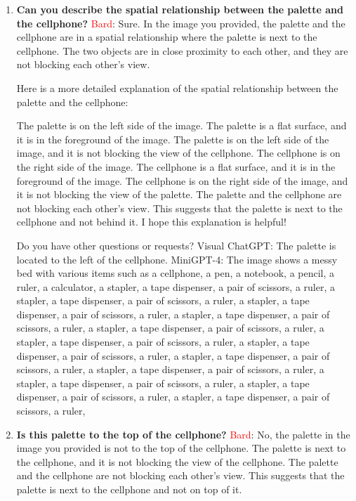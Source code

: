 \begin{enumerate}
    \item \textbf{Can you describe the spatial relationship between the palette and the cellphone?}
    \subitem \textcolor{Red}{Bard}: 
    Sure. In the image you provided, the palette and the cellphone are in a spatial relationship where the palette is next to the cellphone. The two objects are in close proximity to each other, and they are not blocking each other's view.
    
    Here is a more detailed explanation of the spatial relationship between the palette and the cellphone:
    
    The palette is on the left side of the image. The palette is a flat surface, and it is in the foreground of the image. The palette is on the left side of the image, and it is not blocking the view of the cellphone.
    The cellphone is on the right side of the image. The cellphone is a flat surface, and it is in the foreground of the image. The cellphone is on the right side of the image, and it is not blocking the view of the palette.
    The palette and the cellphone are not blocking each other's view. This suggests that the palette is next to the cellphone and not behind it.
    I hope this explanation is helpful!
    
    Do you have other questions or requests?
    \subitem Visual ChatGPT: The palette is located to the left of the cellphone.
    \subitem MiniGPT-4: The image shows a messy bed with various items such as a cellphone, a pen, a notebook, a pencil, a ruler, a calculator, a stapler, a tape dispenser, a pair of scissors, a ruler, a stapler, a tape dispenser, a pair of scissors, a ruler, a stapler, a tape dispenser, a pair of scissors, a ruler, a stapler, a tape dispenser, a pair of scissors, a ruler, a stapler, a tape dispenser, a pair of scissors, a ruler, a stapler, a tape dispenser, a pair of scissors, a ruler, a stapler, a tape dispenser, a pair of scissors, a ruler, a stapler, a tape dispenser, a pair of scissors, a ruler, a stapler, a tape dispenser, a pair of scissors, a ruler, a stapler, a tape dispenser, a pair of scissors, a ruler, a stapler, a tape dispenser, a pair of scissors, a ruler, a stapler, a tape dispenser, a pair of scissors, a ruler,
    \item \textbf{Is this palette to the top of the cellphone?}
    \subitem \textcolor{Red}{Bard}: No, the palette in the image you provided is not to the top of the cellphone. The palette is next to the cellphone, and it is not blocking the view of the cellphone. The palette and the cellphone are not blocking each other's view. This suggests that the palette is next to the cellphone and not on top of it.


\end{enumerate}
